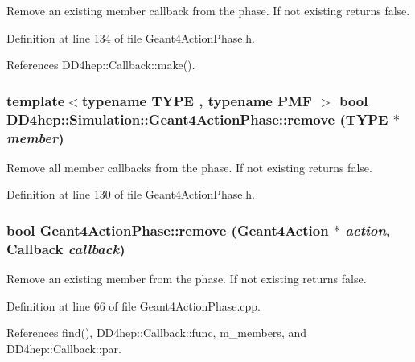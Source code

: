 Remove an existing member callback from the phase. If not existing returns false. 

Definition at line 134 of file Geant4ActionPhase.h.

References DD4hep::Callback::make().\hypertarget{class_d_d4hep_1_1_simulation_1_1_geant4_action_phase_a00496ac37e590398b28f92108e56a35f}{
\subsubsection[{remove}]{\setlength{\rightskip}{0pt plus 5cm}template$<$typename TYPE , typename PMF $>$ bool DD4hep::Simulation::Geant4ActionPhase::remove (TYPE $\ast$ {\em member})}}
\label{class_d_d4hep_1_1_simulation_1_1_geant4_action_phase_a00496ac37e590398b28f92108e56a35f}


Remove all member callbacks from the phase. If not existing returns false. 

Definition at line 130 of file Geant4ActionPhase.h.\hypertarget{class_d_d4hep_1_1_simulation_1_1_geant4_action_phase_aac2407103c62385824359ff8fa680f48}{
\subsubsection[{remove}]{\setlength{\rightskip}{0pt plus 5cm}bool Geant4ActionPhase::remove ({\bf Geant4Action} $\ast$ {\em action}, \/  {\bf Callback} {\em callback})}}
\label{class_d_d4hep_1_1_simulation_1_1_geant4_action_phase_aac2407103c62385824359ff8fa680f48}


Remove an existing member from the phase. If not existing returns false. 

Definition at line 66 of file Geant4ActionPhase.cpp.

References find(), DD4hep::Callback::func, m\_\-members, and DD4hep::Callback::par.

